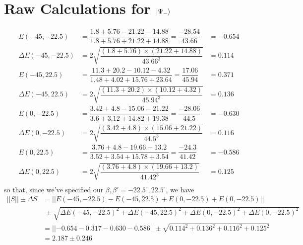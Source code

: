 \documentclass[aps,prl,nofootinbib,twocolumn,superscriptaddress,groupedaddress]{revtex4}  %
\begin{document}
\section{Raw Calculations for $\ket{\Psi_{-}}$}
\begin{align*}
E(-45, -22.5) &= \dfrac{1.8 + 5.76 - 21.22 - 14.88}{1.8 + 5.76 + 21.22 + 14.88} = \dfrac{-28.54}{43.66} &= -0.654\\
\Delta E(-45, -22.5) &= 2\sqrt{\dfrac{(1.8 + 5.76)\times(21.22 + 14.88)}{43.66^{3}}} &= 0.114\\
E(-45, 22.5) &= \dfrac{11.3 + 20.2 - 10.12 - 4.32}{1.48 + 4.02 + 15.76 + 23.64} = \dfrac{17.06}{45.94} &= 0.371\\
\Delta E(-45, 22.5) &= 2\sqrt{\dfrac{(11.3 + 20.2)\times(10.12 + 4.32)}{45.94^{3}}} &= 0.136\\
E(0,-22.5) &= \dfrac{3.42 + 4.8 - 15.06 - 21.22}{3.6 + 3.12 + 14.82 + 19.38} = \dfrac{-28.06}{44.5} &= -0.630\\
\Delta E(0, -22.5) &= 2\sqrt{\dfrac{(3.42 + 4.8)\times(15.06 + 21.22)}{44.5^{3}}} &= 0.116\\
E(0,22.5) &= \dfrac{3.76 + 4.8 - 19.66 - 13.2}{3.52 + 3.54 + 15.78 + 3.54} = \dfrac{-24.3}{41.42} &= -0.586\\
\Delta E(0,22.5) &= 2\sqrt{\dfrac{(3.76 + 4.8)\times(19.66 + 13.2)}{41.42^{3}}} &= 0.125\\
\end{align*}
\noindent so that, since we've specified our $\beta,\beta' = -22.5^{\circ}, 22.5^{\circ}$, we have
\begin{align*}
\lvert| S \rvert| \pm \Delta S &= \lvert|E(-45, -22.5) - E(-45, 22.5) + E(0,-22.5) + E(0,-22.5)\rvert|\\
&\;\pm \sqrt{\Delta E(-45, -22.5)^{2} + \Delta E(-45, 22.5)^{2} + \Delta E(0,-22.5)^{2} + \Delta E(0,-22.5)^{2}}\\
&= \lvert|- 0.654 - 0.317 - 0.630 - 0.586 \rvert| \pm \sqrt{0.114^{2} + 0.136^{2} + 0.116^{2} + 0.125^{2}}\\
&= 2.187 \pm 0.246
\end{align*}
\end{document}
